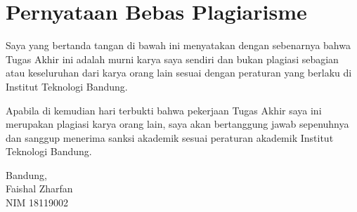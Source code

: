 \clearpage
\chapter*{Pernyataan Bebas Plagiarisme}

Saya yang bertanda tangan di bawah ini menyatakan dengan sebenarnya bahwa Tugas Akhir ini adalah murni karya saya sendiri dan bukan plagiasi sebagian atau keseluruhan dari karya orang lain sesuai dengan peraturan yang berlaku di Institut Teknologi Bandung.

Apabila di kemudian hari terbukti bahwa pekerjaan Tugas Akhir saya ini merupakan plagiasi karya orang lain, saya akan bertanggung jawab sepenuhnya dan sanggup menerima sanksi akademik sesuai peraturan akademik Institut Teknologi Bandung.
\\[\baselineskip]

\hfill
\parbox{5.5cm}{
	Bandung, \thedate \\[2\baselineskip]
	Faishal Zharfan \\
	NIM 18119002
}


